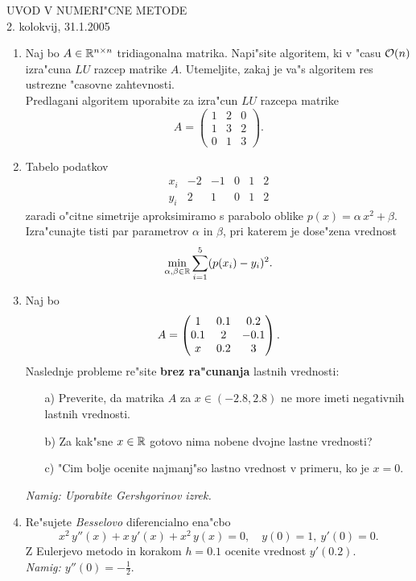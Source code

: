 

\begin{center}
  {\large UVOD V NUMERI"CNE METODE\\
    2. kolokvij, 31.1.2005\\
    }
\end{center}

\begin{enumerate}

  \item Naj bo $A\in\mathbb{R}^{n\times n}$ tridiagonalna matrika. 
    Napi"site algoritem, ki v "casu ${\cal O}(n)$ izra"cuna
    $LU$ razcep matrike $A$. Utemeljite, zakaj je va"s
    algoritem res ustrezne "casovne zahtevnosti.\\
    Predlagani algoritem uporabite za izra"cun $LU$ razcepa matrike
    $$A=\left(
      \begin{array}{ccc}
        1 & 2 & 0\\
        1 & 3 & 2\\
        0 & 1 & 3
      \end{array}
      \right).$$
        
  
  \item Tabelo podatkov
   $$\begin{array}{c|rrrrr}
     x_i & -2 & -1 & 0 & 1 & 2\\ \hline
     y_i &  2 &  1 & 0 & 1 & 2
     \end{array}
   $$
   zaradi o"citne simetrije aproksimiramo s parabolo oblike
    $p(x)=\alpha\,x^2+\beta$. 
    Izra"cunajte tisti par parametrov $\alpha$ in
    $\beta$, pri katerem je dose"zena vrednost
    $$\min_{\alpha,\beta\in\mathbb{R}}\sum_{i=1}^5(p(x_i)-y_i)^2.$$
  
  \item Naj bo 
    $$ 
    A=\begin{pmatrix} 
      1  & 0.1 & 0.2\cr
      0.1 &  2  & -0.1\cr
      x   &  0.2& 3
    \end{pmatrix}.
    $$
    Naslednje probleme re"site {\bf brez ra"cunanja} lastnih vrednosti:
    \begin{itemize}
      \item[a)] Preverite, da matrika $A$ za $x\in(-2.8,2.8)$ ne more imeti 
        negativnih lastnih vrednosti. 
      \item[b)] Za kak"sne $x\in\mathbb{R}$ gotovo nima nobene dvojne
        lastne vrednosti? 
      \item[c)] "Cim bolje ocenite najmanj"so lastno vrednost v primeru, 
        ko je $x=0$.
    \end{itemize}
    {\sl Namig: Uporabite Gershgorinov izrek.}
  
  \item Re"sujete {\sl Besselovo} diferencialno ena"cbo
    $$x^2\,y''(x)+x\,y'(x)+x^2\,y(x)=0, \quad y(0)=1,\ y'(0)=0.$$
    Z Eulerjevo metodo in korakom $h=0.1$ ocenite vrednost
    $y'(0.2)$.\\
    {\sl Namig: $y''(0)=-\frac{1}{2}$}.

\end{enumerate}
 
